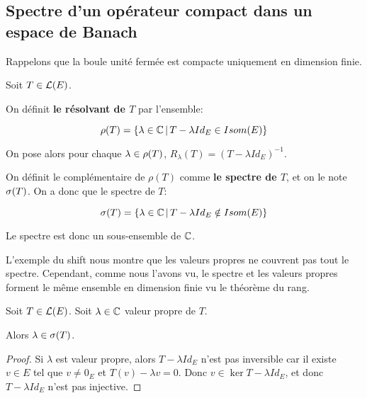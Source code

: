 \subsection{Spectre d'un opérateur compact dans un espace de Banach}

Rappelons que la boule unité fermée est compacte uniquement en dimension finie.

\begin{definition}
	Soit $T \in \mathcal{L}(E)$.

	On définit \textbf{le résolvant de $T$} par l'ensemble:

	\begin{equation}
		\rho(T) = \left\{\lambda \in \mathbb{C} \, | \, T - \lambda
			{Id}_{E} \in Isom(E) \right\}
			\label{def:resolvant_operator}
	\end{equation}

	On pose alors pour chaque $\lambda \in \rho(T)$, $R_{\lambda}(T) = (T -
	\lambda Id_{E})^{-1}$.

	On définit le complémentaire de $\rho(T)$ comme \textbf{le spectre de $T$},
	et on le note $\sigma(T)$.
	On a donc que le spectre de $T$:

	\begin{equation}
		\sigma(T) = \left\{\lambda \in \mathbb{C} \, | \, T - \lambda {Id}_{E}
		\notin Isom(E) \right\}
		\label{def:spectrum_operator}
	\end{equation}
\end{definition}

Le spectre est donc un sous-ensemble de $\mathbb{C}$.

L'exemple du shift nous montre que les valeurs propres ne couvrent pas tout le
spectre.
Cependant, comme nous l'avons vu, le spectre et les valeurs propres forment le
même ensemble en dimension finie vu le théorème du rang.

\begin{proposition}
	Soit $T \in \mathcal{L}(E)$.
	Soit $\lambda \in \mathbb{C}$ valeur propre de $T$.

	Alors $\lambda \in \sigma(T)$.
\end{proposition}

\begin{proof}
	Si $\lambda$ est valeur propre, alors $T - \lambda Id_{E}$ n'est pas
	inversible car il existe $v \in E$ tel que $v \neq 0_{E}$ et $T(v) - \lambda
	v = 0$. Donc $v \in \ker{T - \lambda Id_{E}}$, et donc $T - \lambda Id_{E}$
	n'est pas injective.
\end{proof}

